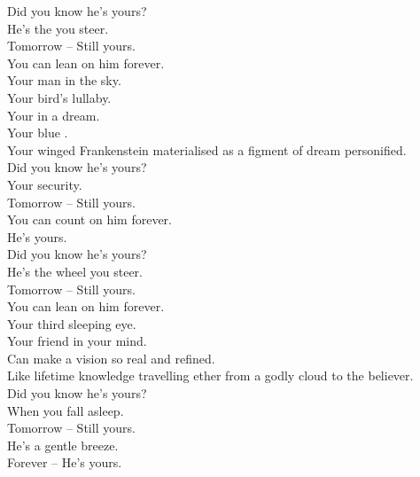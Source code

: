 
\label{album:butterfly-3000}




Did you know he's yours? \\
He's the  you steer. \\
Tomorrow -- Still yours. \\
You can lean on him forever. \\

Your man in the sky. \\
Your bird's lullaby. \\
Your  in a dream. \\
Your blue . \\
Your winged Frankenstein materialised as a figment of dream personified. \\

Did you know he's yours? \\
Your security. \\
Tomorrow -- Still yours. \\
You can count on him forever. \\
He's yours. \\

Did you know he's yours? \\
He's the wheel you steer. \\
Tomorrow -- Still yours. \\
You can lean on him forever. \\

Your third sleeping eye. \\
Your friend in your mind. \\
Can make a vision so real and refined. \\
Like lifetime knowledge travelling ether from a godly cloud to the believer. \\

Did you know he's yours? \\
When you fall asleep. \\
Tomorrow -- Still yours. \\
He's a gentle breeze. \\
Forever -- He's yours. \\

